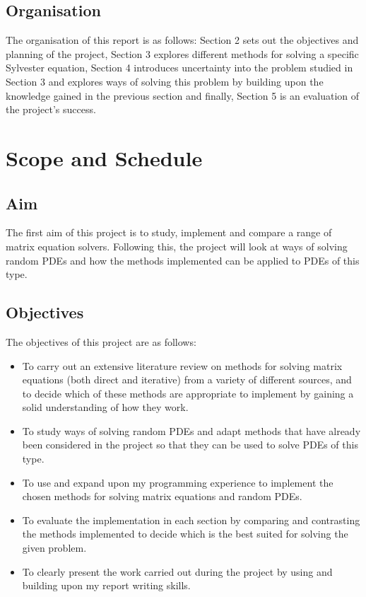 \documentclass[11pt]{article}
\numberwithin{equation}{section}
\begin{document}
\subsection{Organisation}
The organisation of this report is as follows: Section 2 sets out the objectives and planning of the project, Section 3 explores different methods for solving a specific Sylvester equation, Section 4 introduces uncertainty into the problem studied in Section 3 and explores ways of solving this problem by building upon the knowledge gained in the previous section and finally, Section 5 is an evaluation of the project's success.

\newpage

\section{Scope and Schedule}
\subsection{Aim}
The first aim of this project is to study, implement and compare a range of matrix equation solvers. Following this, the project will look at ways of solving random PDEs and how the methods implemented can be applied to PDEs of this type.

\subsection{Objectives}
The objectives of this project are as follows:
\begin{itemize}
\item To carry out an extensive literature review on methods for solving matrix equations (both direct and iterative) from a variety of different sources, and to decide which of these methods are appropriate to implement by gaining a solid understanding of how they work.
\item To study ways of solving random PDEs and adapt methods that have already been considered in the project so that they can be used to solve PDEs of this type. 
\item To use and expand upon my programming experience to implement the chosen methods for solving matrix equations and random PDEs. 
\item To evaluate the implementation in each section by comparing and contrasting the methods implemented to decide which is the best suited for solving the given problem.
\item To clearly present the work carried out during the project by using and building upon my report writing skills.
\end{itemize}
\end{document}
